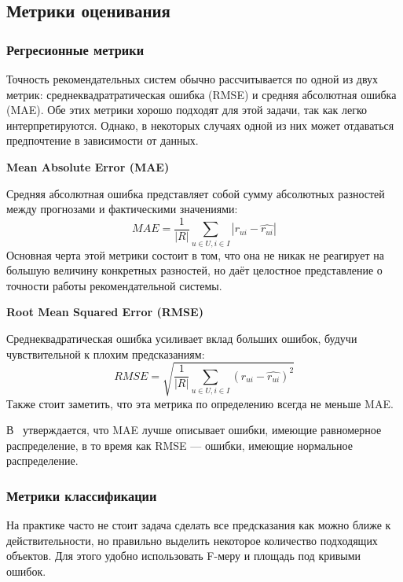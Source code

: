 \subsection{Метрики оценивания}\label{subsec:estimation_metrics}

\subsubsection{Регресионные метрики}
Точность рекомендательных систем обычно рассчитывается по одной из двух метрик: среднеквадратратическая ошибка (RMSE) и средняя абсолютная ошибка (MAE).
Обе этих метрики хорошо подходят для этой задачи, так как легко интерпретируются.
Однако, в некоторых случаях одной из них может отдаваться предпочтение в зависимости от данных.

\vspace{1em}
\textbf{Mean Absolute Error (MAE)}

Средняя абсолютная ошибка представляет собой сумму абсолютных разностей между прогнозами и фактическими значениями:
\begin{equation}\label{eq:mae}
MAE = \frac{1}{|R|} \sum_{u \in U , i \in I} |r_{ui} - \hat{r_{ui}}|
\end{equation}
Основная черта этой метрики состоит в том, что она не никак не реагирует на большую величину конкретных разностей, но даёт целостное представление о точности работы рекомендательной системы.

\vspace{1em}
\textbf{Root Mean Squared Error (RMSE)}

Среднеквадратическая ошибка усиливает вклад больших ошибок, будучи чувствительной к плохим предсказаниям:
\begin{equation}\label{eq:rmse}
RMSE = \sqrt{\frac{1}{|R|} \sum_{u \in U , i \in I} (r_{ui} - \hat{r_{ui}})^2}
\end{equation}
Также стоит заметить, что эта метрика по определению всегда не меньше MAE\@.

В~\cite{chai} утверждается, что MAE лучше описывает ошибки, имеющие равномерное распределение, в то время как RMSE --- ошибки, имеющие нормальное распределение.

\subsubsection{Метрики классификации}
На практике часто не стоит задача сделать все предсказания как можно ближе к действительности, но правильно выделить некоторое количество подходящих объектов.
Для этого удобно использовать F-меру и площадь под кривыми ошибок.


